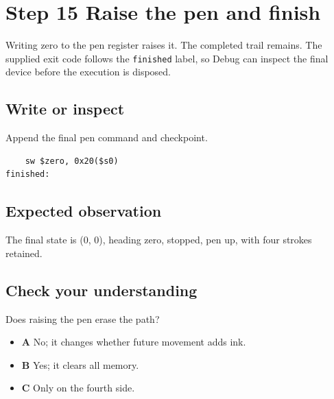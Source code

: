 \section{Step 15 Raise the pen and
  finish}\label{006-marsbot-square-s15-step-15-raise-the-pen-and-finish}

Writing zero to the pen register raises it. The completed trail remains.
The supplied exit code follows the \texttt{finished} label, so Debug can
inspect the final device before the execution is disposed.

\subsection{Write or
  inspect}\label{006-marsbot-square-s15-write-or-inspect}

Append the final pen command and checkpoint.

\begin{verbatim}
    sw $zero, 0x20($s0)
finished:
\end{verbatim}

\subsection{Expected
  observation}\label{006-marsbot-square-s15-expected-observation}

The final state is (0, 0), heading zero, stopped, pen up, with four
strokes retained.

\subsection{Check your
  understanding}\label{006-marsbot-square-s15-check-your-understanding}

Does raising the pen erase the path?

\begin{itemize}
  \tightlist
  \item
        \textbf{A} No; it changes whether future movement adds ink.
  \item
        \textbf{B} Yes; it clears all memory.
  \item
        \textbf{C} Only on the fourth side.
\end{itemize}
